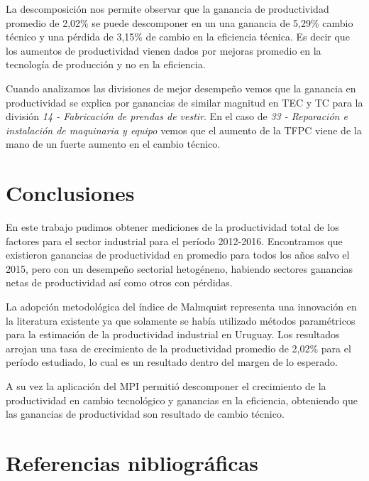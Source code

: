 \documentclass[
]{article}
\begin{document}
La descomposición nos permite observar que la ganancia de productividad
promedio de 2,02\% se puede descomponer en un una ganancia de 5,29\%
cambio técnico y una pérdida de 3,15\% de cambio en la eficiencia
técnica. Es decir que los aumentos de productividad vienen dados por
mejoras promedio en la tecnología de producción y no en la eficiencia.

Cuando analizamos las divisiones de mejor desempeño vemos que la
ganancia en productividad se explica por ganancias de similar magnitud
en TEC y TC para la división \emph{14 - Fabricación de prendas de
vestir}. En el caso de \emph{33 - Reparación e instalación de maquinaria
y equipo} vemos que el aumento de la TFPC viene de la mano de un fuerte
aumento en el cambio técnico.

\hypertarget{conclusiones}{%
\section{Conclusiones}\label{conclusiones}}

En este trabajo pudimos obtener mediciones de la productividad total de
los factores para el sector industrial para el período 2012-2016.
Encontramos que existieron ganancias de productividad en promedio para
todos los años salvo el 2015, pero con un desempeño sectorial
hetogéneno, habiendo sectores ganancias netas de productividad así como
otros con pérdidas.

La adopción metodológica del índice de Malmquist representa una
innovación en la literatura existente ya que solamente se había
utilizado métodos paramétricos para la estimación de la productividad
industrial en Uruguay. Los resultados arrojan una tasa de crecimiento de
la productividad promedio de 2,02\% para el período estudiado, lo cual
es un resultado dentro del margen de lo esperado.

A su vez la aplicación del MPI permitió descomponer el crecimiento de la
productividad en cambio tecnológico y ganancias en la eficiencia,
obteniendo que las ganancias de productividad son resultado de cambio
técnico.

\hypertarget{referencias-nibliogruxe1ficas}{%
\section{Referencias
nibliográficas}\label{referencias-nibliogruxe1ficas}}
\end{document}
